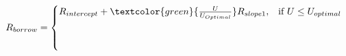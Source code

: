 \documentclass[preview]{standalone}
\begin{document}
\begin{align*}
R_{borrow} = \begin{cases} R_{intercept} + \textcolor{green}{\frac{U}{U_{Optimal}}}R_{slope1}, & \text{if } U \leq U_{optimal} \\[6pt] & \text{ } \\ & \text{ } \end{cases}
\end{align*}
\end{document}
